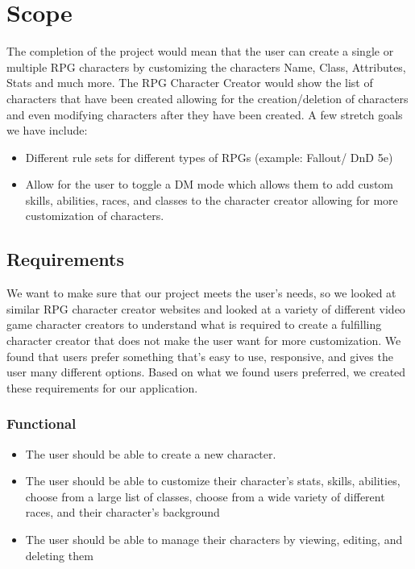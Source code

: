 \documentclass[10pt,conference,onecolumn,compsoc]{IEEEtran}
\begin{document}
\section{Scope}
The completion of the project would mean that the user can create a single or multiple RPG characters by customizing the characters Name, Class, Attributes, Stats and much more.
The RPG Character Creator would show the list of characters that have been created allowing for the creation/deletion of characters and even modifying characters after they have been created.
A few stretch goals we have include:
\begin{itemize} 
\item Different rule sets for different types of RPGs (example: Fallout/ DnD 5e)
\item Allow for the user to toggle a DM mode which allows them to add custom skills, abilities, races, and  classes to the character creator allowing for more customization of characters.
\end{itemize}

\subsection{Requirements}
We want to make sure that our project meets the user's needs, so we looked at similar RPG character creator websites and looked at a variety of different video game character creators to understand what is required to create a fulfilling character creator that does not make the user want for more customization. We found that users prefer something that's easy to use, responsive, and gives the user many different options. Based on what we found users preferred, we created these requirements for our application.

\subsubsection{Functional}
\begin{itemize}
\item The user should be able to create a new character.
\item The user should be able to customize their character's stats, skills, abilities, choose from a large list of classes, choose from a wide variety of different races, and their character's background
\item The user should be able to manage their characters by viewing, editing, and deleting them
\end{itemize}
\end{document}
